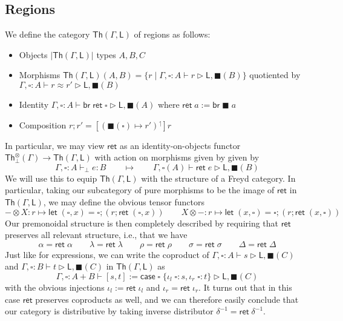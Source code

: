 \documentclass[acmsmall,screen,review]{acmart}
\newcommand{\ms}[1]{\ensuremath{\mathsf{#1}}}
\newcommand{\lto}{:}
\newcommand{\linl}[1]{\iota_l\;{#1}}
\newcommand{\linr}[1]{\iota_r\;{#1}}
\newcommand{\brb}[2]{\ms{br}\;#1\;#2}
\newcommand{\casestmt}[5]{\ms{case}\;#1\;\{\linl{#2} \lto #3, \linr{#4} \lto #5\}}
\newcommand{\lupg}[1]{{#1}^\upharpoonleft}
\newcommand{\bhyp}[2]{#1 : #2}
\newcommand{\hasty}[4]{#1 \vdash_{#2} #3: {#4}}
\newcommand{\haslb}[3]{#1 \vdash #2 \rhd #3}
\newcommand{\teqv}{\approx}
\newcommand{\lbeq}[4]{#1 \vdash #2 \teqv #3 \rhd {#4}}
\newcommand{\invar}{\square}
\newcommand{\outlb}{\blacksquare}
\begin{document}
\subsection{Regions}

We define the category $\ms{Th}(\Gamma, \ms{L})$ of regions as follows:
\begin{itemize}
  \item Objects $|\ms{Th}(\Gamma, \ms{L})|$ types $A, B, C$
  \item Morphisms $\ms{Th}(\Gamma, \ms{L})(A, B) = 
    \{r \mid \haslb{\Gamma, \bhyp{\invar}{A}}{r}{\ms{L}, \outlb(B)}\}$ 
    quotiented by $\lbeq{\Gamma, \bhyp{\invar}{A}}{r}{r'}{\ms{L}, \outlb(B)}$
  \item Identity $\haslb{\Gamma, \bhyp{\invar}{A}}{\ms{br}\;\ms{ret}\;\invar}{\ms{L}, \outlb(A)}$
    where $\ms{ret}\;a := \brb{\outlb}{a}$
  \item Composition $r;r' = [\lupg{(\outlb(\invar) \mapsto r')}]r$
\end{itemize}
In particular, we may view $\ms{ret}$ as an identity-on-objects functor
$\ms{Th}^\otimes_\bot(\Gamma) \to \ms{Th}(\Gamma, \ms{L})$ with action on morphisms given by given
by 
\begin{equation}
  \hasty{\Gamma, \invar : A}{\bot}{e}{B} 
  \qquad \mapsto \qquad 
  \haslb{\Gamma, \invar(A)}{\ms{ret}\;e}{\ms{L}, \outlb(B)}
\end{equation}
We will use this to equip $\ms{Th}(\Gamma, \ms{L})$ with the structure of a Freyd category.
In particular, taking our subcategory of pure morphisms to be the image of $\ms{ret}$ in 
$\ms{Th}(\Gamma, \ms{L})$, we may define the obvious tensor functors
\begin{equation}
  - \otimes X : r \mapsto \ms{let}\;(\invar, x) = \invar; (r ; \ms{ret}\;(\invar, x)) \qquad
  X \otimes - : r \mapsto \ms{let}\;(x, \invar) = \invar; (r ; \ms{ret}\;(x, \invar))
\end{equation}
Our premonoidal structure is then completely described by requiring that $\ms{ret}$ preserves all
relevant structure, i.e., that we have
\begin{equation}
  \alpha = \ms{ret}\;\alpha \qquad
  \lambda = \ms{ret}\;\lambda \qquad
  \rho = \ms{ret}\;\rho \qquad
  \sigma = \ms{ret}\;\sigma \qquad
  \Delta = \ms{ret}\;\Delta
\end{equation}
Just like for expressions, we can write the coproduct of 
$\haslb{\Gamma, \bhyp{\invar}{A}}{s}{\ms{L}, \outlb(C)}$ and
$\haslb{\Gamma, \bhyp{\invar}{B}}{t}{\ms{L}, \outlb(C)}$
in $\ms{Th}(\Gamma, \ms{L})$ as
\begin{equation}
  \haslb{\Gamma, \invar : A + B}{[s, t] 
    := \casestmt{\invar}{\invar}{s}{\invar}{t}}{\ms{L}, \outlb(C)}
\end{equation}
with the obvious injections $\iota_l := \ms{ret}\;\iota_l$ and $\iota_r = \ms{ret}\;\iota_r$. It
turns out that in this case $\ms{ret}$ preserves coproducts as well, and we can therefore easily
conclude that our category is distributive by taking inverse distributor $\delta^{-1} =
\ms{ret}\;\delta^{-1}$.
\end{document}
